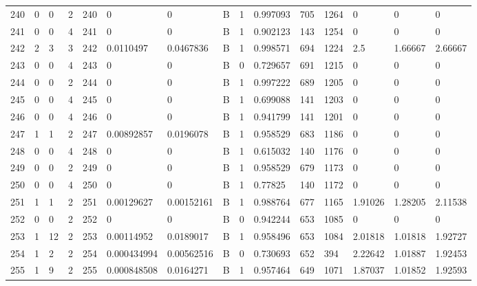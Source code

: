 \begin{latin}
\begin{longtable}{lllllllllllllll}
	240 & 0  & 0   & 2  & 240 & 0              & 0              & B & 1  & 0.997093 & 705  & 1264 & 0       & 0       & 0       \\
	241 & 0  & 0   & 4  & 241 & 0              & 0              & B & 1  & 0.902123 & 143  & 1254 & 0       & 0       & 0       \\
	242 & 2  & 3   & 3  & 242 & 0.0110497      & 0.0467836      & B & 1  & 0.998571 & 694  & 1224 & 2.5     & 1.66667 & 2.66667 \\
	243 & 0  & 0   & 4  & 243 & 0              & 0              & B & 0  & 0.729657 & 691  & 1215 & 0       & 0       & 0       \\
	244 & 0  & 0   & 2  & 244 & 0              & 0              & B & 1  & 0.997222 & 689  & 1205 & 0       & 0       & 0       \\
	245 & 0  & 0   & 4  & 245 & 0              & 0              & B & 1  & 0.699088 & 141  & 1203 & 0       & 0       & 0       \\
	246 & 0  & 0   & 4  & 246 & 0              & 0              & B & 1  & 0.941799 & 141  & 1201 & 0       & 0       & 0       \\
	247 & 1  & 1   & 2  & 247 & 0.00892857     & 0.0196078      & B & 1  & 0.958529 & 683  & 1186 & 0       & 0       & 0       \\
	248 & 0  & 0   & 4  & 248 & 0              & 0              & B & 1  & 0.615032 & 140  & 1176 & 0       & 0       & 0       \\
	249 & 0  & 0   & 2  & 249 & 0              & 0              & B & 1  & 0.958529 & 679  & 1173 & 0       & 0       & 0       \\
	250 & 0  & 0   & 4  & 250 & 0              & 0              & B & 1  & 0.77825  & 140  & 1172 & 0       & 0       & 0       \\
	251 & 1  & 1   & 2  & 251 & 0.00129627     & 0.00152161     & B & 1  & 0.988764 & 677  & 1165 & 1.91026 & 1.28205 & 2.11538 \\
	252 & 0  & 0   & 2  & 252 & 0              & 0              & B & 0  & 0.942244 & 653  & 1085 & 0       & 0       & 0       \\
	253 & 1  & 12  & 2  & 253 & 0.00114952     & 0.0189017      & B & 1  & 0.958496 & 653  & 1084 & 2.01818 & 1.01818 & 1.92727 \\
	254 & 1  & 2   & 2  & 254 & 0.000434994    & 0.00562516     & B & 0  & 0.730693 & 652  & 394  & 2.22642 & 1.01887 & 1.92453 \\
	255 & 1  & 9   & 2  & 255 & 0.000848508    & 0.0164271      & B & 1  & 0.957464 & 649  & 1071 & 1.87037 & 1.01852 & 1.92593 \\

\end{longtable}
\end{latin}
